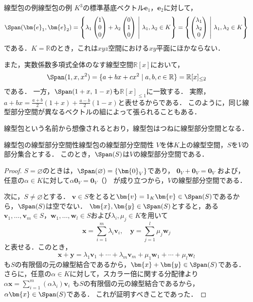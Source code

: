 \begin{example}{線型包の例}{線型包の例}
  $K^3$の標準基底ベクトル$\bm{e}_1$，$\bm{e}_2$に対して，
  \[
    \Span(\bm{e}_1, \bm{e}_2)
    = \left\{ \lambda_1 \begin{pmatrix} 1 \\ 0 \\ 0 \end{pmatrix} + \lambda_2 \begin{pmatrix} 0 \\ 1 \\ 0 \end{pmatrix} ~\middle|~ \lambda_1, \lambda_2 \in K \right\}
    = \left\{ \begin{pmatrix} \lambda_1 \\ \lambda_2 \\ 0 \end{pmatrix} ~\middle|~ \lambda_1, \lambda_2 \in K \right\}
  \]
  である．$K = \mathbb{R}$のとき，これは$xyz$空間における$xy$平面にほかならない．

  また，実数係数多項式全体のなす線型空間$\mathbb{R}[x]$において，
  \[
    \Span(1, x, x^2)
    = \{ a + bx + cx^2 \mid a, b, c \in \mathbb{R} \}
    = \mathbb{R}[x]_{\le 2}
  \]
  である．
  一方，$\Span(1+x,\,1-x)$も$\mathbb{R}[x]_{\le 1}$に一致する．
  実際，$a+bx=\frac{a+b}{2}(1+x)+\frac{a-b}{2}(1-x)$と表せるからである．
  このように，同じ線型部分空間が異なるベクトルの組によって張られることもある．
\end{example}

線型包という名前から想像されるとおり，線型包はつねに線型部分空間となる．

\begin{prop}{線型包の線型部分空間性}{線型包の線型部分空間性}
  $V$を体$K$上の線型空間，$S$を$V$の部分集合とする．
  このとき，$\Span(S)$は$V$の線型部分空間である．
\end{prop}

\begin{tleftbar}
\begin{proof}
  $S = \varnothing$のときは，$\Span(\varnothing) = \{\bm{0}_V\}$であり，
  $\bm{0}_V + \bm{0}_V = \bm{0}_V$
  および，任意の$\alpha \in K$に対して$\alpha \bm{0}_V = \bm{0}_V$（）
  が成り立つから，$V$の線型部分空間である．

  次に，$S \neq \varnothing$とする．
  $\bm{v} \in S$をとると$\bm{v} = 1_K \bm{v} \in \Span(S)$であるから，$\Span(S)$は空でない．
  $\bm{x}, \bm{y} \in \Span(S)$とすると，ある$\bm{v}_1, \dots, \bm{v}_m \in S$，$\bm{w}_1, \dots, \bm{w}_l \in S$および$\lambda_i, \mu_j \in K$を用いて
  \[
    \bm{x} = \sum_{i=1}^{m} \lambda_i \bm{v}_i, \quad
    \bm{y} = \sum_{j=1}^{l} \mu_j \bm{w}_j
  \]
  と表せる．このとき，
  \[
    \bm{x} + \bm{y}
    = \lambda_1 \bm{v}_1 + \cdots + \lambda_m \bm{v}_m + \mu_1 \bm{w}_1 + \cdots + \mu_l \bm{w}_l
  \]
  も$S$の有限個の元の線型結合であるから，$\bm{x} + \bm{y} \in \Span(S)$である．
  さらに，任意の$\alpha \in K$に対して，スカラー倍に関する分配律より
  $\alpha\bm{x} = \sum_{i=1}^{m} (\alpha\lambda_i) \bm{v}_i$
  も$S$の有限個の元の線型結合であるから，$\alpha\bm{x} \in \Span(S)$である．
  これが証明すべきことであった．
\end{proof}
\end{tleftbar}

